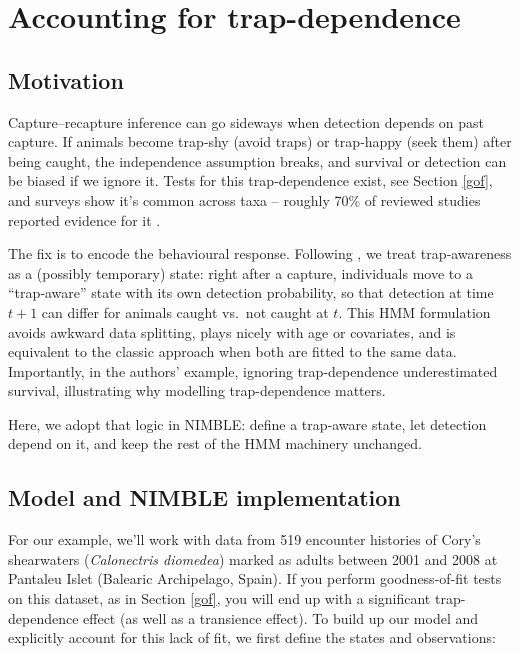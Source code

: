 \documentclass[
  12pt,
]{krantz}
\begin{document}
\section{Accounting for trap-dependence}\label{trapdep}

\subsection{Motivation}\label{motivation-3}

Capture--recapture inference can go sideways when detection depends on past capture. If animals become trap‐shy (avoid traps) or trap‐happy (seek them) after being caught, the independence assumption breaks, and survival or detection can be biased if we ignore it. Tests for this trap‐dependence exist, see Section \ref{gof}, and surveys show it's common across taxa -- roughly 70\% of reviewed studies reported evidence for it \citet{pradeltrapdep2012}.

The fix is to encode the behavioural response. Following \citet{pradeltrapdep2012}, we treat trap‐awareness as a (possibly temporary) state: right after a capture, individuals move to a ``trap‐aware'' state with its own detection probability, so that detection at time \(t+1\) can differ for animals caught vs.~not caught at \(t\). This HMM formulation avoids awkward data splitting, plays nicely with age or covariates, and is equivalent to the classic approach when both are fitted to the same data. Importantly, in the authors' example, ignoring trap‐dependence underestimated survival, illustrating why modelling trap-dependence matters.

Here, we adopt that logic in NIMBLE: define a trap‐aware state, let detection depend on it, and keep the rest of the HMM machinery unchanged.

\subsection{Model and NIMBLE implementation}\label{model-and-nimble-implementation-3}

For our example, we'll work with data from 519 encounter histories of Cory's shearwaters (\emph{Calonectris diomedea}) marked as adults between 2001 and 2008 at Pantaleu Islet (Balearic Archipelago, Spain). If you perform goodness-of-fit tests on this dataset, as in Section \ref{gof}, you will end up with a significant trap-dependence effect (as well as a transience effect). To build up our model and explicitly account for this lack of fit, we first define the states and observations:
\end{document}
